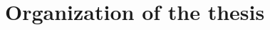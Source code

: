 \documentclass[dwyatte_dissertation.tex]{subfiles}
\begin{document}
{\section{Organization of the thesis} 
%
%
%
%


}
\end{document}
